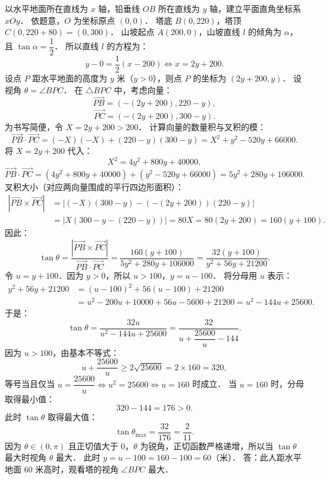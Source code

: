 \begin{answer}
以水平地面所在直线为 $x$ 轴，铅垂线 $OB$ 所在直线为 $y$ 轴，建立平面直角坐标系 $xOy$．
依题意，$O$ 为坐标原点 $(0, 0)$．
塔底 $B(0, 220)$，塔顶 $C(0, 220 + 80) = (0, 300)$．
山坡起点 $A(200, 0)$，山坡直线 $l$ 的倾角为 $\alpha$，且 $\tan\alpha = \dfrac{1}{2}$．
所以直线 $l$ 的方程为：
\nopagebreak[4]
\[
y - 0 = \dfrac{1}{2}(x - 200) \iff x = 2y + 200.
\]
设点 $P$ 距水平地面的高度为 $y$ 米（$y > 0$），则点 $P$ 的坐标为 $(2y + 200, y)$．
设视角 $\theta = \angle BPC$．
在 $\triangle BPC$ 中，考虑向量：
\nopagebreak[4]
\[
\vec{PB} = (-(2y + 200), 220 - y),
\]
\nopagebreak[4]
\[
\vec{PC} = (-(2y + 200), 300 - y).
\]
为书写简便，令 $X = 2y + 200 > 200$．
计算向量的数量积与叉积的模：
\nopagebreak[4]
\[
\vec{PB}\cdot\vec{PC} = (-X)(-X) + (220 - y)(300 - y) = X^2 + y^2 - 520y + 66000.
\]
将 $X = 2y + 200$ 代入：
\nopagebreak[4]
\[
X^2 = 4y^2 + 800y + 40000,
\]
\nopagebreak[4]
\[
\vec{PB}\cdot\vec{PC} = (4y^2 + 800y + 40000) + (y^2 - 520y + 66000) = 5y^2 + 280y + 106000.
\]
叉积大小（对应两向量围成的平行四边形面积）：
\nopagebreak[4]
\[
\begin{aligned}
|\vec{PB} \times \vec{PC}| &= |(-X)(300 - y) - (-(2y + 200))(220 - y)| \\
&= |X(300 - y - (220 - y))| = 80X = 80(2y + 200) = 160(y + 100).
\end{aligned}
\]
因此：
\nopagebreak[4]
\[
\tan\theta = \dfrac{|\vec{PB} \times \vec{PC}|}{\vec{PB}\cdot\vec{PC}} = \dfrac{160(y + 100)}{5y^2 + 280y + 106000} = \dfrac{32(y + 100)}{y^2 + 56y + 21200}.
\]
令 $u = y + 100$．因为 $y > 0$，所以 $u > 100$，$y = u - 100$．
将分母用 $u$ 表示：
\nopagebreak[4]
\[
\begin{aligned}
y^2 + 56y + 21200 &= (u - 100)^2 + 56(u - 100) + 21200 \\
&= u^2 - 200u + 10000 + 56u - 5600 + 21200 = u^2 - 144u + 25600.
\end{aligned}
\]
于是：
\nopagebreak[4]
\[
\tan\theta = \dfrac{32u}{u^2 - 144u + 25600} = \dfrac{32}{u + \dfrac{25600}{u} - 144}.
\]
因为 $u > 100$，由基本不等式：
\nopagebreak[4]
\[
u + \dfrac{25600}{u} \geqslant 2\sqrt{25600} = 2 \times 160 = 320,
\]
等号当且仅当 $u = \dfrac{25600}{u} \iff u^2 = 25600 \iff u = 160$ 时成立．
当 $u = 160$ 时，分母取得最小值：
\nopagebreak[4]
\[
320 - 144 = 176 > 0.
\]
此时 $\tan\theta$ 取得最大值：
\nopagebreak[4]
\[
\tan\theta_{\max} = \dfrac{32}{176} = \dfrac{2}{11}.
\]
因为 $\theta \in (0, \pi)$ 且正切值大于 $0$，$\theta$ 为锐角，正切函数严格递增，所以当 $\tan\theta$ 最大时视角 $\theta$ 最大．
此时 $y = u - 100 = 160 - 100 = 60$（米）．
答：此人距水平地面 $60$ 米高时，观看塔的视角 $\angle BPC$ 最大．


\end{answer}
